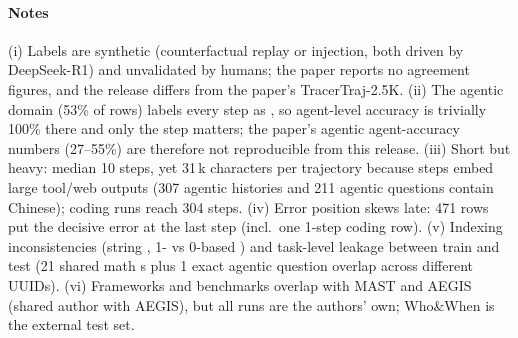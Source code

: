 \paragraph{Notes} (i) Labels are synthetic (counterfactual replay or injection, both driven by DeepSeek-R1) and unvalidated by humans; the paper reports no agreement figures, and the release differs from the paper's TracerTraj-2.5K. (ii) The agentic domain (53\% of rows) labels every step as , so agent-level accuracy is trivially 100\% there and only the step matters; the paper's agentic agent-accuracy numbers (27--55\%) are therefore not reproducible from this release. (iii) Short but heavy: median 10 steps, yet 31\,k characters per trajectory because steps embed large tool/web outputs (307 agentic histories and 211 agentic questions contain Chinese); coding runs reach 304 steps. (iv) Error position skews late: 471 rows put the decisive error at the last step (incl.\ one 1-step coding row). (v) Indexing inconsistencies (string , 1- vs 0-based ) and task-level leakage between train and test (21 shared math s plus 1 exact agentic question overlap across different UUIDs). (vi) Frameworks and benchmarks overlap with MAST and AEGIS (shared author with AEGIS), but all runs are the authors' own; Who\&When is the external test set.
